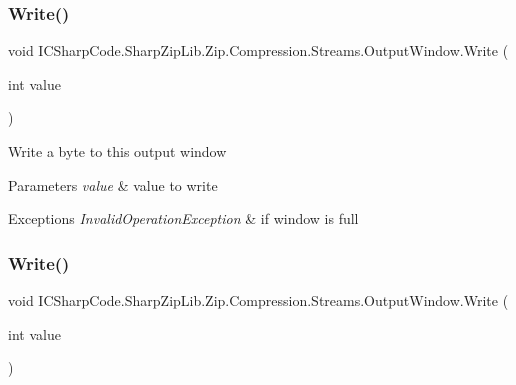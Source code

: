 \subsubsection{\texorpdfstring{Write()}{Write()}\hspace{0.1cm}{\footnotesize\ttfamily [1/2]}}
{\footnotesize\ttfamily void I\+C\+Sharp\+Code.\+Sharp\+Zip\+Lib.\+Zip.\+Compression.\+Streams.\+Output\+Window.\+Write (\begin{DoxyParamCaption}\item[{int}]{value }\end{DoxyParamCaption})\hspace{0.3cm}{\ttfamily [inline]}}



Write a byte to this output window 


\begin{DoxyParams}{Parameters}
{\em value} & value to write\\
\hline
\end{DoxyParams}

\begin{DoxyExceptions}{Exceptions}
{\em Invalid\+Operation\+Exception} & if window is full \\
\hline
\end{DoxyExceptions}
\mbox{\label{class_i_c_sharp_code_1_1_sharp_zip_lib_1_1_zip_1_1_compression_1_1_streams_1_1_output_window_a907667959a906512f4e133765f58f5f6}} 
\subsubsection{\texorpdfstring{Write()}{Write()}\hspace{0.1cm}{\footnotesize\ttfamily [2/2]}}
{\footnotesize\ttfamily void I\+C\+Sharp\+Code.\+Sharp\+Zip\+Lib.\+Zip.\+Compression.\+Streams.\+Output\+Window.\+Write (\begin{DoxyParamCaption}\item[{int}]{value }\end{DoxyParamCaption})\hspace{0.3cm}{\ttfamily [inline]}}



